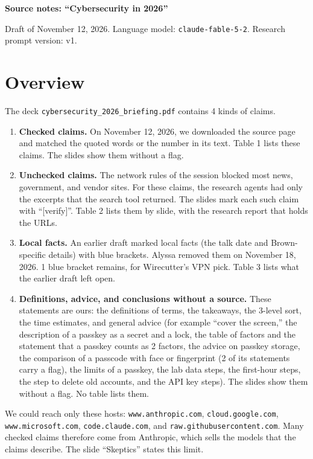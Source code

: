 \documentclass[10pt]{article}
\begin{document}
{\LARGE\bfseries Source notes: ``Cybersecurity in 2026''}\par
Draft of November 12, 2026. Language model: \texttt{claude-fable-5-2}. Research prompt version: v1.

\section*{Overview}
The deck \texttt{cybersecurity\_2026\_briefing.pdf} contains 4 kinds of claims.
\begin{enumerate}
\item \textbf{Checked claims.} On November 12, 2026, we downloaded the source page and matched the quoted words or the number in its text. Table 1 lists these claims. The slides show them without a flag.
\item \textbf{Unchecked claims.} The network rules of the session blocked most news, government, and vendor sites. For these claims, the research agents had only the excerpts that the search tool returned. The slides mark each such claim with ``[verify]''. Table 2 lists them by slide, with the research report that holds the URLs.
\item \textbf{Local facts.} An earlier draft marked local facts (the talk date and Brown-specific details) with blue brackets. Alyssa removed them on November 18, 2026. 1 blue bracket remains, for Wirecutter's VPN pick. Table 3 lists what the earlier draft left open.
\item \textbf{Definitions, advice, and conclusions without a source.} These statements are ours: the definitions of terms, the takeaways, the 3-level sort, the time estimates, and general advice (for example ``cover the screen,'' the description of a passkey as a secret and a lock, the table of factors and the statement that a passkey counts as 2 factors, the advice on passkey storage, the comparison of a passcode with face or fingerprint (2 of its statements carry a flag), the limits of a passkey, the lab data steps, the first-hour steps, the step to delete old accounts, and the API key steps). The slides show them without a flag. No table lists them.
\end{enumerate}
We could reach only these hosts: \texttt{www.anthropic.com}, \texttt{cloud.google.com}, \texttt{www.microsoft.com}, \texttt{code.claude.com}, and \texttt{raw.githubusercontent.com}. Many checked claims therefore come from Anthropic, which sells the models that the claims describe. The slide ``Skeptics'' states this limit.
\end{document}
